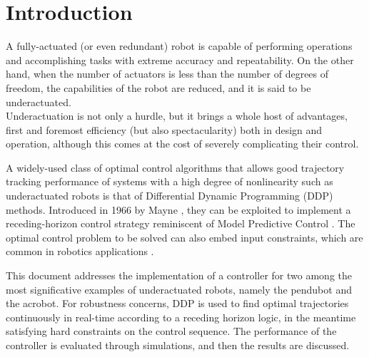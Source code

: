 \section{Introduction}
A fully-actuated (or even redundant) robot is capable of performing operations and accomplishing tasks with extreme accuracy and repeatability. On the other hand, when the number of actuators is less than the number of degrees of freedom, the capabilities of the robot are reduced, and it is said to be underactuated. \\
Underactuation is not only a hurdle, but it brings a whole host of advantages, first and foremost efficiency (but also spectacularity) both in design and operation, although this comes at the cost of severely complicating their control.

A widely-used class of optimal control algorithms that allows good trajectory tracking performance of systems with a high degree of nonlinearity such as underactuated robots is that of Differential Dynamic Programming (DDP) methods. Introduced in 1966 by Mayne \cite{mayne}, they can be exploited to implement a receding-horizon control strategy reminiscent of Model Predictive Control \cite{tassa07}. The optimal control problem to be solved can also embed input constraints, which are common in robotics applications \cite{tassa14}. 

This document addresses the implementation of a controller for two among the most significative examples of underactuated robots, namely the pendubot and the acrobot. For robustness concerns, DDP is used to find optimal trajectories continuously in real-time according to a receding horizon logic, in the meantime satisfying hard constraints on the control sequence. The performance of the controller is evaluated through simulations, and then the results are discussed.